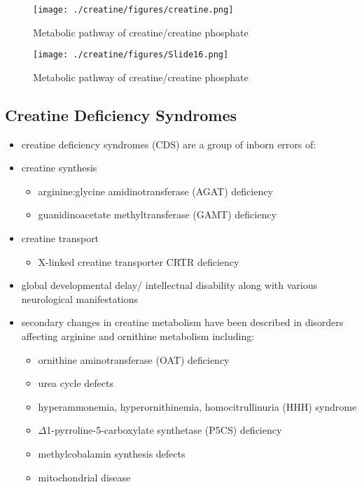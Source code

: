 \documentclass{scrartcl}
\begin{document}
\begin{figure}[htbp]
\centering
\texttt{[image: ./creatine/figures/creatine.png]}
\caption{\label{fig:org1aea417}
Metabolic pathway of creatine/creatine phosphate}
\end{figure}

\begin{figure}[htbp]
\centering
\texttt{[image: ./creatine/figures/Slide16.png]}
\caption{\label{fig:orgd216090}
Metabolic pathway of creatine/creatine phosphate}
\end{figure}

\subsection{Creatine Deficiency Syndromes}
\label{sec:org6fa7f25}
\begin{itemize}
\item creatine deficiency syndromes (CDS) are a group of inborn errors of:
\item creatine synthesis
\begin{itemize}
\item arginine:glycine amidinotransferase (AGAT) deficiency
\item guanidinoacetate methyltransferase (GAMT) deficiency
\end{itemize}
\item creatine transport
\begin{itemize}
\item X-linked creatine transporter CRTR deficiency
\end{itemize}
\item global developmental delay/ intellectual disability along with
various neurological manifestations

\item secondary changes in creatine metabolism have been described in
disorders affecting arginine and ornithine metabolism including:
\begin{itemize}
\item ornithine aminotransferase (OAT) deficiency
\item urea cycle defects
\item hyperammonemia, hyperornithinemia, homocitrullinuria (HHH) syndrome
\item \(\Delta\)1-pyrroline-5-carboxylate synthetase (P5CS) deficiency
\item methylcobalamin synthesis defects
\item mitochondrial disease
\end{itemize}
\end{itemize}
\end{document}
